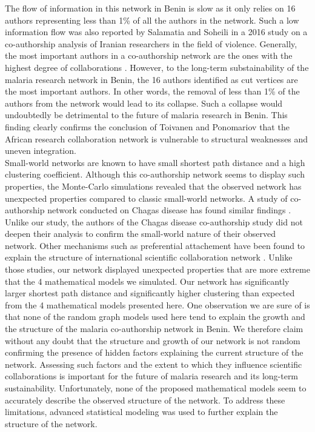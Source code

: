 The flow of information in this network in Benin is slow as it only relies on 16 authors representing less than 1\% of all the authors in the network. Such a low information flow was also reported by Salamatia and Soheili \cite{salamati_social_2016} in a 2016 study on a co-authorship analysis of Iranian researchers in the field of violence. Generally, the most important authors in a co-authorship network are the ones with the highest degree of collaborations \cite{bales_social_2008, bales_evolution_2011}. However, to the long-term substainability of the malaria research network in Benin, the 16 authors identified as cut vertices are the most important authors. In other words, the removal of less than 1\% of the authors from the network would lead to its collapse. Such a collapse would undoubtedly be detrimental to the future of malaria research in Benin. This finding clearly confirms the conclusion of Toivanen and Ponomariov \cite{toivanen_african_2011} that the African research collaboration network is vulnerable to structural weaknesses and uneven integration.\\%
Small-world networks are known to have small shortest path distance and a high clustering coefficient. Although this co-authorship network seems to display such properties, the Monte-Carlo simulations revealed that the observed network has unexpected properties compared to classic small-world networks. A study of co-authorship network conducted on Chagas disease has found similar findings \cite{gonzalez-alcaide_scientific_2012}. Unlike our study, the authors of the Chagas disease co-authorship study did not deepen their analysis to confirm the small-world nature of their observed network. Other mechanisms such as preferential attachement have been found to explain the structure of international scientific collaboration network \cite{wagner_network_2005}. Unlike those studies, our network displayed unexpected properties that are more extreme that the 4 mathematical models we simulated. Our network has significantly larger shortest path distance and significantly higher clustering than expected from the 4 mathematical models presented here. One observation we are sure of is that none of the random graph models used here tend to explain the growth and the structure of the malaria co-authorship network in Benin. We therefore claim without any doubt that the structure and growth of our network is not random confirming the presence of hidden factors explaining the current structure of the network. Assessing such factors and the extent to which they influence scientific collaborations is important for the future of malaria research and its long-term sustainability. Unfortunately, none of the proposed mathematical models seem to accurately describe the observed structure of the network. To address these limitations, advanced statistical modeling was used to further explain the structure of the network. \\%
